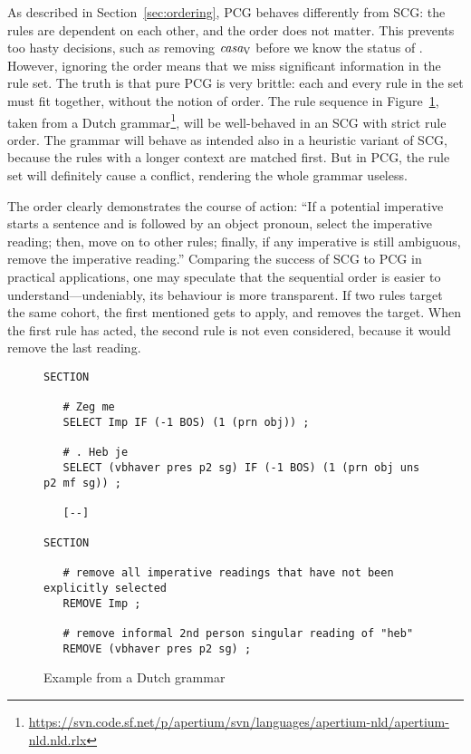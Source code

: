 As described in Section~\ref{sec:ordering}, PCG behaves differently from 
SCG: the rules are dependent on each other, and the order does not matter.
This prevents too hasty decisions, such as removing $\text{\em casa}_{\text{\sc V}}$ before we know the status of \la{}. 
However, ignoring the order means that we miss significant information in the rule set. 
The truth is that pure PCG is very brittle: each and every rule in the set must fit together, without the notion of order. The rule sequence in Figure~\ref{fig:ruleOrder}, taken from a Dutch grammar\footnote{\url{https://svn.code.sf.net/p/apertium/svn/languages/apertium-nld/apertium-nld.nld.rlx}}, will be well-behaved in an SCG with strict rule order.
The grammar will behave as intended also in a heuristic variant of SCG,
because the rules with a longer context are matched first.
But in PCG, the rule set will definitely cause a conflict, rendering the whole grammar useless.



The order clearly demonstrates the course of action: ``If a potential imperative starts a sentence and is followed by an object pronoun, select the imperative reading; then, move on to other rules; finally, if any imperative is still ambiguous, remove the imperative reading.'' 
Comparing the success of SCG to PCG in practical applications, one may speculate that the sequential order is easier to understand---undeniably, its behaviour is more transparent. %
If two rules target the same cohort, the first mentioned gets to apply, and removes the target. When the first rule has acted, the second rule is not even considered, because it would remove the last reading.




\begin{figure}[ht]
\centering
   \begin{verbatim}
SECTION

   # Zeg me
   SELECT Imp IF (-1 BOS) (1 (prn obj)) ;

   # . Heb je
   SELECT (vbhaver pres p2 sg) IF (-1 BOS) (1 (prn obj uns p2 mf sg)) ;

   [--]

SECTION

   # remove all imperative readings that have not been explicitly selected
   REMOVE Imp ;

   # remove informal 2nd person singular reading of "heb"
   REMOVE (vbhaver pres p2 sg) ;

   \end{verbatim}
\caption{Example from a Dutch grammar}
\label{fig:ruleOrder}
\end{figure}


